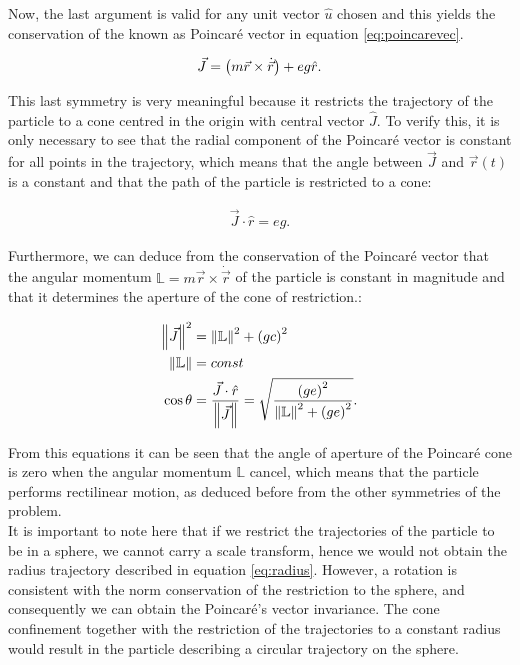 Now, the last argument is valid for any unit vector $\hat{u}$ chosen and this yields the conservation of the  known as Poincar\'e vector in equation \eqref{eq:poincarevec}.

\begin{equation}
\vec{J} = \left( m\vec{r}\times\dot{\vec{r}} \right)+ eg\hat{r}.
\label{eq:poincarevec}
\end{equation}

This last symmetry is very meaningful because it restricts the trajectory of the particle to a cone centred in the origin with central vector $\hat{J}$. To verify this, it is only necessary to see that the radial component of the Poincar\'e vector is constant for all points in the trajectory, which means that the angle between $\vec{J}$ and $\vec{r}(t)$ is a constant and that the path of the particle is restricted to a cone:

\begin{align*}
\vec{J}\cdot\hat{r} = eg.
\end{align*}

Furthermore, we can deduce from the conservation of the Poincar\'e vector that the angular momentum $\mathbb{L}= m\vec{r}\times\dot{\vec{r}}$ of the particle is constant in magnitude and that it determines the aperture of the cone of restriction.:

\begin{equation}
\begin{aligned}
\left\lVert \vec{J} \right\rVert^2 &= \left\lVert \mathbb{L} \right\rVert^2 +\left( gc \right)^2\\
\left\lVert \mathbb{L} \right\rVert &= const\\
\cos{\theta} &= \frac{\vec{J}\cdot\hat{r}}{\left\lVert \vec{J} \right\rVert} = \sqrt{\frac{\left( ge \right)^2}{\left\lVert \mathbb{L} \right\rVert^2 +\left( ge \right)^2}}.
\end{aligned}
\label{eq:poincarecone}
\end{equation}

From this equations it can be seen that the angle of aperture of the Poincar\'e cone is zero when the angular momentum $\mathbb{L}$ cancel, which means that the particle performs rectilinear motion, as deduced before from the other symmetries of the problem.\\

It is important to note here that if we restrict the trajectories of the particle to be in a sphere, we cannot carry a scale transform, hence we would not obtain the radius trajectory described in equation \eqref{eq:radius}. However, a rotation is consistent with the norm conservation of the restriction to the sphere, and consequently we can obtain the Poincar\'e's vector invariance. The cone confinement together with the restriction of the trajectories to a constant radius would result in the particle describing a circular trajectory on the sphere.\\ 

